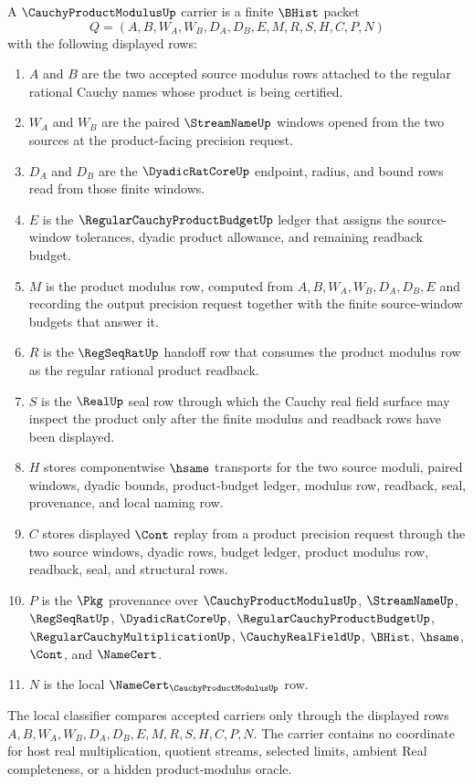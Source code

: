 \begin{definition}
\label{def:cauchy-product-modulus-carrier}
A $\CauchyProductModulusUp$ carrier is a finite $\BHist$ packet
$$
Q=(A,B,W_A,W_B,D_A,D_B,E,M,R,S,H,C,P,N)
$$
with the following displayed rows:
\begin{enumerate}
\item $A$ and $B$ are the two accepted source modulus rows attached to the regular rational Cauchy names whose product is being certified.
\item $W_A$ and $W_B$ are the paired $\StreamNameUp$ windows opened from the two sources at the product-facing precision request.
\item $D_A$ and $D_B$ are the $\DyadicRatCoreUp$ endpoint, radius, and bound rows read from those finite windows.
\item $E$ is the $\RegularCauchyProductBudgetUp$ ledger that assigns the source-window tolerances, dyadic product allowance, and remaining readback budget.
\item $M$ is the product modulus row, computed from $A,B,W_A,W_B,D_A,D_B,E$ and recording the output precision request together with the finite source-window budgets that answer it.
\item $R$ is the $\RegSeqRatUp$ handoff row that consumes the product modulus row as the regular rational product readback.
\item $S$ is the $\RealUp$ seal row through which the Cauchy real field surface may inspect the product only after the finite modulus and readback rows have been displayed.
\item $H$ stores componentwise $\hsame$ transports for the two source moduli, paired windows, dyadic bounds, product-budget ledger, modulus row, readback, seal, provenance, and local naming row.
\item $C$ stores displayed $\Cont$ replay from a product precision request through the two source windows, dyadic rows, budget ledger, product modulus row, readback, seal, and structural rows.
\item $P$ is the $\Pkg$ provenance over $\CauchyProductModulusUp$, $\StreamNameUp$, $\RegSeqRatUp$, $\DyadicRatCoreUp$, $\RegularCauchyProductBudgetUp$, $\RegularCauchyMultiplicationUp$, $\CauchyRealFieldUp$, $\BHist$, $\hsame$, $\Cont$, and $\NameCert$.
\item $N$ is the local $\NameCert_{\CauchyProductModulusUp}$ row.
\end{enumerate}
The local classifier compares accepted carriers only through the displayed rows $A,B,W_A,W_B,D_A,D_B,E,M,R,S,H,C,P,N$. The carrier contains no coordinate for host real multiplication, quotient streams, selected limits, ambient Real completeness, or a hidden product-modulus oracle.
\end{definition}

